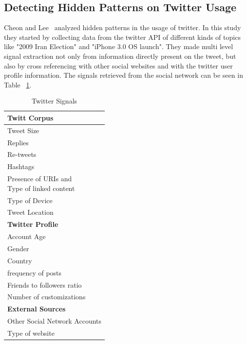 \subsection{Detecting Hidden Patterns on Twitter Usage} 
\label{sub:detecting_hidden_patterns_on_twitter_usage}
Cheon and Lee~\citep{Cheong2010} analyzed hidden patterns in the usage of twitter. In this study they started by collecting data from the twitter API of different kinds of topics like "2009 Iran Election" and "iPhone 3.0 OS launch". They made multi level signal extraction not only from information directly present on the tweet, but also by cross referencing with other social websites and with the twitter user profile information. The signals retrieved from the social network can be seen in Table ~\ref{tab:twitter_signals}.

\begin{table}[H]
  \caption{Twitter Signals}
  \label{tab:twitter_signals}
  \begin{center}
    \begin{tabular}{|l|}
      \hline
      \textbf{Twitt Corpus}  \\
      \hline
      Tweet Size \\
      \hline
      Replies \\
      \hline
      Re-tweets \\
      \hline
      Hashtags  \\
      \hline
      \specialcell{Presence of URIs and \\ Type of linked content} \\
      \hline
      Type of Device   \\
      \hline
      Tweet Location  \\
      \hline                 
      \hline                 
      \textbf{Twitter Profile} \\ 
      \hline
      Account Age   \\
      \hline
      Gender     \\
      \hline
      Country \\    
      \hline
      frequency of posts \\
      \hline
      Friends to followers ratio \\ 
      \hline
      Number of  customizations \\   
      \hline
      \hline
      \textbf{External Sources} \\
      \hline
      Other Social Network Accounts   \\
      \hline
      Type of website\\ 
      \hline
    \end{tabular}
  \end{center}
\end{table}
